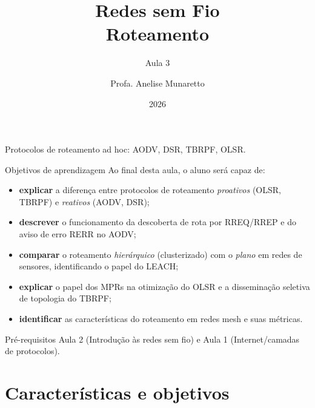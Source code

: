 \documentclass[aspectratio=169,11pt]{beamer}
\title[Redes sem Fio]{Redes sem Fio\\ Roteamento}
\subtitle{Aula 3}
\author[Anelise Munaretto]{Profa. Anelise Munaretto}
\institute[Curso]{Redes sem Fio --- Ciência da Computação}
\date{2026}
\begin{document}
\begin{frame}[plain]
  \titlepage
  \begin{center}
    \scriptsize Protocolos de roteamento ad hoc: AODV, DSR, TBRPF, OLSR.
  \end{center}
\end{frame}

\begin{frame}{Objetivos de aprendizagem}
  Ao final desta aula, o aluno será capaz de:
  \begin{itemize}
    \item \textbf{explicar} a diferença entre protocolos de roteamento \emph{proativos} (OLSR, TBRPF) e \emph{reativos} (AODV, DSR);
    \item \textbf{descrever} o funcionamento da descoberta de rota por RREQ/RREP e do aviso de erro RERR no AODV;
    \item \textbf{comparar} o roteamento \emph{hierárquico} (clusterizado) com o \emph{plano} em redes de sensores, identificando o papel do LEACH;
    \item \textbf{explicar} o papel dos MPRs na otimização do OLSR e a disseminação seletiva de topologia do TBRPF;
    \item \textbf{identificar} as características do roteamento em redes mesh e suas métricas.
  \end{itemize}
  \begin{alertblock}{Pré-requisitos}
    Aula 2 (Introdução às redes sem fio) e Aula 1 (Internet/camadas de protocolos).
  \end{alertblock}
\end{frame}

\section{Características e objetivos}
\end{document}
